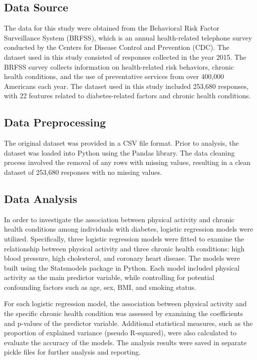 \documentclass[11pt]{article}
\begin{document}
\subsection*{Data Source}
The data for this study were obtained from the Behavioral Risk Factor Surveillance System (BRFSS), which is an annual health-related telephone survey conducted by the Centers for Disease Control and Prevention (CDC). The dataset used in this study consisted of responses collected in the year 2015. The BRFSS survey collects information on health-related risk behaviors, chronic health conditions, and the use of preventative services from over 400,000 Americans each year. The dataset used in this study included 253,680 responses, with 22 features related to diabetes-related factors and chronic health conditions.

\subsection*{Data Preprocessing}
The original dataset was provided in a CSV file format. Prior to analysis, the dataset was loaded into Python using the Pandas library. The data cleaning process involved the removal of any rows with missing values, resulting in a clean dataset of 253,680 responses with no missing values.

\subsection*{Data Analysis}
In order to investigate the association between physical activity and chronic health conditions among individuals with diabetes, logistic regression models were utilized. Specifically, three logistic regression models were fitted to examine the relationship between physical activity and three chronic health conditions: high blood pressure, high cholesterol, and coronary heart disease. The models were built using the Statsmodels package in Python. Each model included physical activity as the main predictor variable, while controlling for potential confounding factors such as age, sex, BMI, and smoking status.

For each logistic regression model, the association between physical activity and the specific chronic health condition was assessed by examining the coefficients and p-values of the predictor variable. Additional statistical measures, such as the proportion of explained variance (pseudo R-squared), were also calculated to evaluate the accuracy of the models. The analysis results were saved in separate pickle files for further analysis and reporting.
\end{document}

